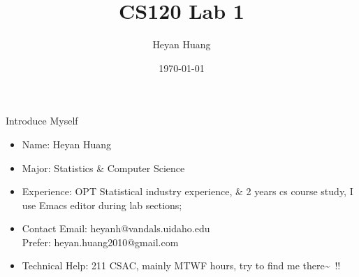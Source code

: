 \documentclass[presentation]{beamer}
\author{Heyan Huang}
\date{\today}
\title{CS120 Lab 1}
\begin{document}
\maketitle

\begin{frame}[label=sec-1]{Introduce Myself}
\begin{itemize}
\item Name: \alert{Heyan Huang}
\item Major: Statistics \& \alert{Computer Science}
\item Experience: OPT Statistical industry experience, \& 2 years cs course study, I use Emacs editor during lab sections;
\item Contact Email: \alert{heyanh@vandals.uidaho.edu} \\ Prefer: \alert{heyan.huang2010@gmail.com}
\item Technical Help: \alert{211 CSAC}, mainly \alert{MTWF} hours, try to find me there\textasciitilde{}~!!
\end{itemize}
\end{frame}
\end{document}
